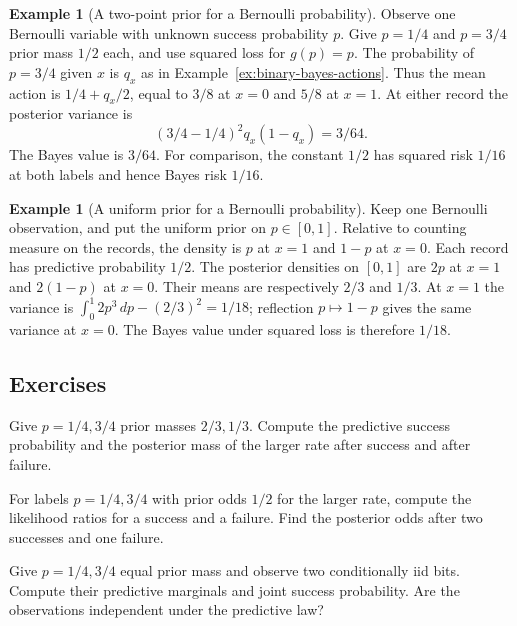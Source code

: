 \documentclass[11pt,oneside]{book}
\theoremstyle{definition}
\newtheorem{example}[theorem]{Example}
\theoremstyle{remark}
\begin{document}
\begin{example}[A two-point prior for a Bernoulli probability]
\label{ex:bayes-two-point-bernoulli}
Observe one Bernoulli variable with unknown success probability $p$.
Give $p=1/4$ and $p=3/4$ prior mass $1/2$ each, and use squared loss for
$g(p)=p$. The probability of $p=3/4$ given $x$ is $q_x$ as in
Example~\ref{ex:binary-bayes-actions}. Thus the mean action is
$1/4+q_x/2$, equal to $3/8$ at $x=0$ and $5/8$ at $x=1$.
At either record the posterior variance is
\[
(3/4-1/4)^2q_x(1-q_x)=3/64.
\]
The Bayes value is $3/64$. For comparison, the constant $1/2$ has
squared risk $1/16$ at both labels and hence Bayes risk $1/16$.
\end{example}

\begin{example}[A uniform prior for a Bernoulli probability]
\label{ex:bayes-uniform-bernoulli}
Keep one Bernoulli observation, and put the uniform prior on $p\in[0,1]$.
Relative to counting measure on the records, the density is $p$ at
$x=1$ and $1-p$ at $x=0$. Each record has predictive probability $1/2$.
The posterior densities on $[0,1]$ are $2p$ at $x=1$ and $2(1-p)$ at
$x=0$. Their means are respectively $2/3$ and $1/3$.
At $x=1$ the variance is $\int_0^1 2p^3\,dp-(2/3)^2=1/18$;
reflection $p\mapsto1-p$ gives the same variance at $x=0$.
The Bayes value under squared loss is therefore $1/18$.
\end{example}

\subsection{Exercises}
\label{subsec:worked-examples-2-3}

\begin{practiceexercise}
\label{wex:unequal-coin-prior}
Give $p=1/4,3/4$ prior masses $2/3,1/3$. Compute the predictive success
probability and the posterior mass of the larger rate after success and
after failure.
\end{practiceexercise}

\begin{practiceexercise}
\label{wex:coin-posterior-odds}
For labels $p=1/4,3/4$ with prior odds $1/2$ for the larger rate, compute
the likelihood ratios for a success and a failure. Find the posterior odds
after two successes and one failure.
\end{practiceexercise}

\begin{practiceexercise}
\label{wex:prior-induced-dependence}
Give $p=1/4,3/4$ equal prior mass and observe two conditionally iid bits.
Compute their predictive marginals and joint success probability. Are the
observations independent under the predictive law?
\end{practiceexercise}
\end{document}
